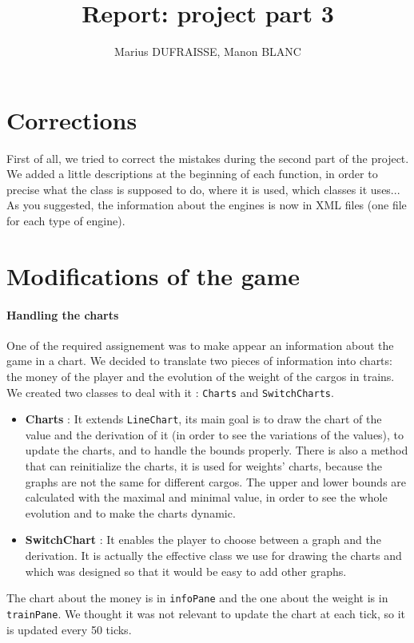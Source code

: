 \documentclass[a4paper]{article}
\title{Report: project part 3}
\author{Marius DUFRAISSE, Manon BLANC}
\date{  }
\begin{document}
	\maketitle
	\thispagestyle{fancy}
	\section{Corrections}
	
	First of all, we tried to correct the mistakes during the second part of the project. We added a little descriptions at the beginning of each function, in order to precise what the class is supposed to do, where it is used, which classes it uses... As you suggested, the information about the engines is now in XML files (one file for each type of engine).
	
	\section{Modifications of the game}
	
	\paragraph{Handling the charts} 
	One of the required assignement was to make appear an information about the game in a chart. We decided to translate two pieces of information into charts: the money of the player and the evolution of the weight of the cargos in trains. We created two classes to deal with it : \texttt{Charts} and \texttt{SwitchCharts}. 
	\begin{itemize}
		\item \textbf{Charts }: It extends \texttt{LineChart}, its main goal is to draw the chart of the value and the derivation of it (in order to see the variations of the values), to update the charts, and to handle the bounds properly. There is also a method that can reinitialize the charts, it is used for weights' charts, because the graphs are not the same for different cargos. The upper and lower bounds are calculated with the maximal and minimal value, in order to see the whole evolution and to make the charts dynamic. 
		\item \textbf{SwitchChart} : It enables the player to choose between a graph and the derivation. It is actually the effective class we use for drawing the charts and which was designed so that it would be easy to add other graphs.
	\end{itemize} 
	The chart about the money is in \texttt{infoPane} and the one about the weight is in \texttt{trainPane}. We thought it was not relevant to update the chart at each tick, so it is updated every 50 ticks.
\end{document}
